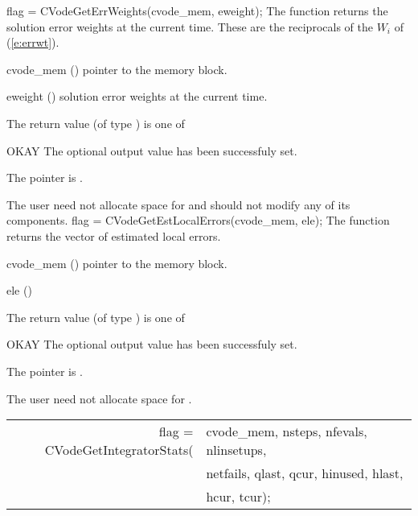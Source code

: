{}
{
  flag = CVodeGetErrWeights(cvode\_mem, eweight);
}
{
  The function  returns the solution error weights 
  at the current time. These are the reciprocals of the $W_i$ of (\ref{e:errwt}).
}
{
  \begin{args}
  \item[cvode\_mem] ()
    pointer to the {\cvodes} memory block.
  \item[eweight] ()
    solution error weights at the current time.
  \end{args}
}
{
  The return value  (of type ) is one of
  \begin{args}
  \item[OKAY] 
    The optional output value has been successfuly set.
  \item[\Id{CVG\_NO\_MEM}]
    The  pointer is .
  \end{args}
}
{
  The user need not allocate space for  and should not modify
  any of its components.
}
{
  flag = CVodeGetEstLocalErrors(cvode\_mem, ele);
}
{
  The function  returns the
  vector of estimated local errors.
}
{
  \begin{args}
  \item[cvode\_mem] ()
    pointer to the {\cvodes} memory block.
  \item[ele] ()
    
  \end{args}
}
{
  The return value  (of type ) is one of
  \begin{args}
  \item[OKAY] 
    The optional output value has been successfuly set.
  \item[\Id{CVG\_NO\_MEM}]
    The  pointer is .
  \end{args}
}
{
  The user need not allocate space for .
}
{
  \begin{tabular}[t]{@{}r@{}l@{}}
    flag = CVodeGetIntegratorStats(&cvode\_mem, nsteps, nfevals, nlinsetups, \\
                                   &netfails, qlast, qcur, hinused, hlast, \\
                                   &hcur, tcur);
  \end{tabular}
}
